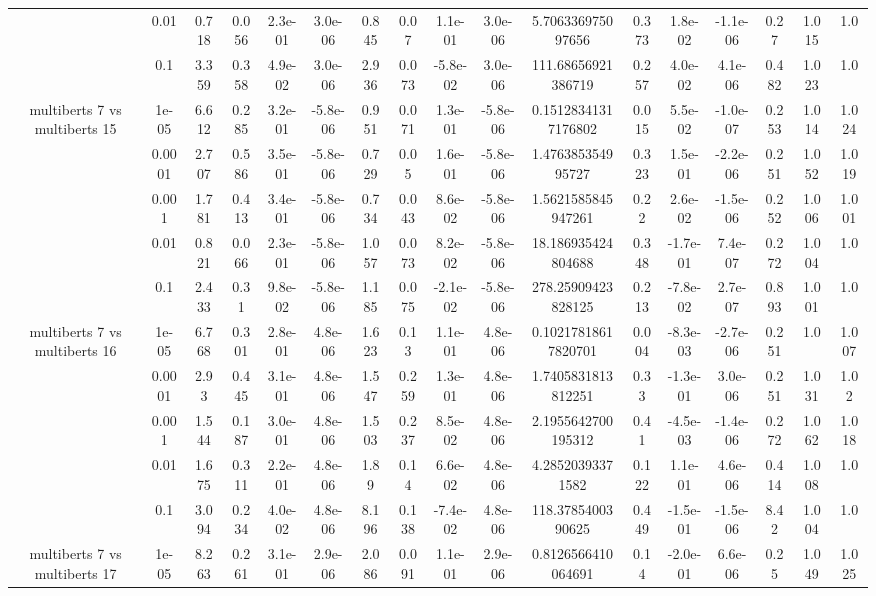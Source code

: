 \begin{tabular}{|c|c|c|c|c|c|c|c|c|c|c|c|c|c|c|c|c|}
 & 0.01 & 0.718 & 0.056 & 2.3e-01 & 3.0e-06 & 0.845 & 0.07 & 1.1e-01 & 3.0e-06 & 5.706336975097656 & 0.373 & 1.8e-02 & -1.1e-06 & 0.27 & 1.015 & 1.0 \\
 & 0.1 & 3.359 & 0.358 & 4.9e-02 & 3.0e-06 & 2.936 & 0.073 & -5.8e-02 & 3.0e-06 & 111.68656921386719 & 0.257 & 4.0e-02 & 4.1e-06 & 0.482 & 1.023 & 1.0 \\
\hline
\multirow{5}{*}{multiberts 7 vs multiberts 15} & 1e-05 & 6.612 & 0.285 & 3.2e-01 & -5.8e-06 & 0.951 & 0.071 & 1.3e-01 & -5.8e-06 & 0.15128341317176802 & 0.015 & 5.5e-02 & -1.0e-07 & 0.253 & 1.014 & 1.024 \\
 & 0.0001 & 2.707 & 0.586 & 3.5e-01 & -5.8e-06 & 0.729 & 0.05 & 1.6e-01 & -5.8e-06 & 1.476385354995727 & 0.323 & 1.5e-01 & -2.2e-06 & 0.251 & 1.052 & 1.019 \\
 & 0.001 & 1.781 & 0.413 & 3.4e-01 & -5.8e-06 & 0.734 & 0.043 & 8.6e-02 & -5.8e-06 & 1.5621585845947261 & 0.22 & 2.6e-02 & -1.5e-06 & 0.252 & 1.006 & 1.001 \\
 & 0.01 & 0.821 & 0.066 & 2.3e-01 & -5.8e-06 & 1.057 & 0.073 & 8.2e-02 & -5.8e-06 & 18.186935424804688 & 0.348 & -1.7e-01 & 7.4e-07 & 0.272 & 1.004 & 1.0 \\
 & 0.1 & 2.433 & 0.31 & 9.8e-02 & -5.8e-06 & 1.185 & 0.075 & -2.1e-02 & -5.8e-06 & 278.25909423828125 & 0.213 & -7.8e-02 & 2.7e-07 & 0.893 & 1.001 & 1.0 \\
\hline
\multirow{5}{*}{multiberts 7 vs multiberts 16} & 1e-05 & 6.768 & 0.301 & 2.8e-01 & 4.8e-06 & 1.623 & 0.13 & 1.1e-01 & 4.8e-06 & 0.10217818617820701 & 0.004 & -8.3e-03 & -2.7e-06 & 0.251 & 1.0 & 1.007 \\
 & 0.0001 & 2.93 & 0.445 & 3.1e-01 & 4.8e-06 & 1.547 & 0.259 & 1.3e-01 & 4.8e-06 & 1.7405831813812251 & 0.33 & -1.3e-01 & 3.0e-06 & 0.251 & 1.031 & 1.02 \\
 & 0.001 & 1.544 & 0.187 & 3.0e-01 & 4.8e-06 & 1.503 & 0.237 & 8.5e-02 & 4.8e-06 & 2.1955642700195312 & 0.41 & -4.5e-03 & -1.4e-06 & 0.272 & 1.062 & 1.018 \\
 & 0.01 & 1.675 & 0.311 & 2.2e-01 & 4.8e-06 & 1.89 & 0.14 & 6.6e-02 & 4.8e-06 & 4.28520393371582 & 0.122 & 1.1e-01 & 4.6e-06 & 0.414 & 1.008 & 1.0 \\
 & 0.1 & 3.094 & 0.234 & 4.0e-02 & 4.8e-06 & 8.196 & 0.138 & -7.4e-02 & 4.8e-06 & 118.3785400390625 & 0.449 & -1.5e-01 & -1.5e-06 & 8.42 & 1.004 & 1.0 \\
\hline
\multirow{5}{*}{multiberts 7 vs multiberts 17} & 1e-05 & 8.263 & 0.261 & 3.1e-01 & 2.9e-06 & 2.086 & 0.091 & 1.1e-01 & 2.9e-06 & 0.8126566410064691 & 0.14 & -2.0e-01 & 6.6e-06 & 0.25 & 1.049 & 1.025 \\

\end{tabular}

